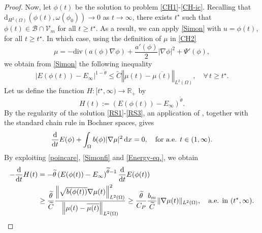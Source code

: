 \documentclass[11pt,reqno]{amsart}
\theoremstyle{remark}
\newcommand \norm[1] {\left\Vert #1\right\Vert}
\def\d{{\rm d}}
\def\ddt{\frac{\d}{\d t}}
\def\div{\mathrm{div}}
\numberwithin{equation}{section}
\def\d{{\rm d}}
\begin{document}
\begin{proof}
\smallskip
Now, let $\phi(t)$ be the solution to problem \eqref{CH1}-\eqref{CH-ic}. Recalling that $\mathrm{d}_{H^2(\Omega)}(\phi(t), \omega(\phi_0)) \to 0$ as $t \to \infty$, there exists $t^\star$ such that
$\phi(t) \in \mathcal{B}\cap \mathcal{V}_m$ for all $t\geq t^\star$.  As a result, we can apply \eqref{Simon} with $u=\phi(t)$, for all $t\geq t^\star$. In which case, using the definition of $\mu$ in \eqref{CH2}
$$
\mu=-\div(a(\phi)\nabla \phi)+\frac{a'(\phi)}{2} |\nabla \phi|^2+\Psi'(\phi),
$$
we obtain from \eqref{Simon} the following inequality
\begin{equation}
\label{Simonfi}
|E(\phi(t))- E_\infty|^{1-\widetilde{\theta}}
\leq \widetilde{C}\norm{\mu(t)-\overline{\mu(t)}}_{L^2(\Omega)}\!\!, \quad
\forall \, t\geq t^\star.
\end{equation}
\medskip
Let us define the function $H: [ t^\star, \infty) \to \mathbb{R}_+$ by
$$
H(t):= \left( E(\phi(t))- E_\infty \right)^{\widetilde{\theta}}\!.
$$
By the regularity of the solution \eqref{RS1}-\eqref{RS3}, an application of \cite[Lemma 2.6]{SP2013}, together with the standard chain rule in Bochner spaces, gives
\begin{equation}
\label{Energy-eq.}
\ddt E(\phi) + \int_{\Omega} b(\phi)|\nabla \mu|^2 \, \d x =0,
\quad \text{for a.e. } t \in (1,\infty).
\end{equation}
By exploiting \eqref{poincare}, \eqref{Simonfi} and \eqref{Energy-eq.}, we obtain
\begin{align*}
- \ddt H(t)
&= - \widetilde{\theta} \left( E(\phi(t))- E_\infty \right)^{\widetilde{\theta}-1} \ddt E(\phi(t))
\\
&\geq \frac{\widetilde{\theta} }{\widetilde{C}} \frac{ \norm{ \sqrt{b(\phi(t))} \nabla \mu(t)}_{L^2(\Omega)}^2 }{\norm{\mu(t)-\overline{\mu(t)}}_{L^2(\Omega)} }
\geq \frac{\widetilde{\theta} }{C_P} \frac{b_m}{\widetilde{C} } \|\nabla \mu (t) \|_{L^2(\Omega)},
\quad \text{a.e. in } (t^\star, \infty).
\end{align*}

\end{proof}
\end{document}
